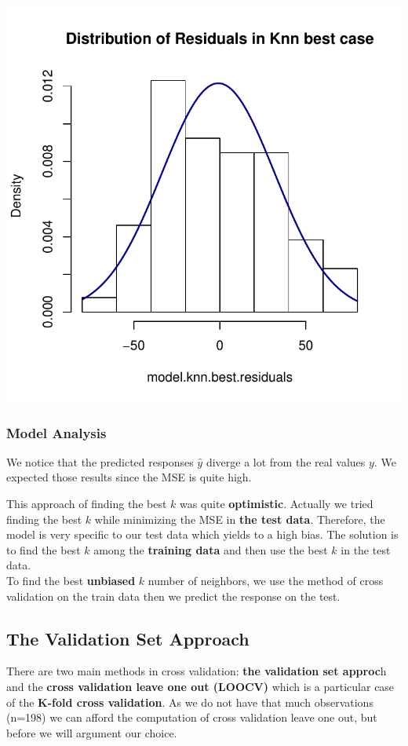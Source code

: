 \documentclass[]{report}
\begin{document}
\begin{center}
	\includegraphics[width=0.9\linewidth]{Figures/knn_predicted_test_residuals.pdf}
	\label{fig:knn_predicted_test_residuals}
\end{center}


\subsubsection{Model Analysis}

We notice that the predicted responses {$\hat{y}$} diverge a lot from the real values $y$. We expected those results since the MSE is quite high. 

This approach of finding the best $k$ was quite \textbf{optimistic}. Actually we tried finding the best $k$ while minimizing the MSE in \textbf{the test data}. Therefore, the model is very specific to our test data which yields to a high bias. The solution is to find the best $k$ among the \textbf{training data} and then use the best $k$ in the test data. \\ To find the best \textbf{unbiased} $k$ number of neighbors, we use the method of cross validation on the train data then we predict the response on the test. 

\subsection{The Validation Set Approach}
There are two main methods in cross validation: \textbf{the validation set approc}h and the \textbf{cross validation leave one out (LOOCV)} which is a particular case of the  \textbf{K-fold cross validation}. As we do not have that much observations (n=198) we can afford the computation of cross validation leave one out, but before we will argument our choice.\\
\end{document}
